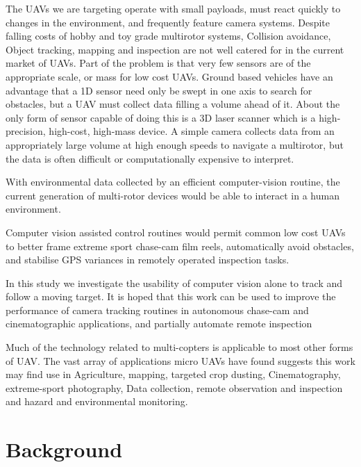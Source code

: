 \documentclass[a4paper, 11pt, titlepage]{article}
\begin{document}
      The UAVs we are targeting operate with small payloads, must react quickly to changes in the environment, and frequently feature camera systems.
      Despite falling costs of hobby and toy grade multirotor systems, Collision avoidance, Object tracking,   mapping and inspection are not well catered for in the current market of UAVs.
      Part of the problem is that very few sensors are of the appropriate scale, or mass for low cost UAVs.
      Ground based vehicles have an advantage that a 1D sensor need only be swept in one axis to search for obstacles, but a UAV must collect data filling a volume ahead of it. About the only form of sensor capable of doing this is a 3D laser scanner which is a high-precision, high-cost, high-mass device.
      A simple camera collects data from an appropriately large volume at high enough speeds to navigate a multirotor, but the data is often difficult or computationally expensive to interpret.

      With environmental data collected by an efficient computer-vision routine, the current generation of multi-rotor devices would be able to interact in a human environment.

      Computer vision assisted control routines would permit common low cost UAVs to better frame extreme sport chase-cam film reels, automatically avoid obstacles, and stabilise GPS variances in remotely operated inspection tasks.

      In this study we investigate the usability of computer vision alone to track and follow a moving target.  It is hoped that this work can be used to improve the performance of camera tracking routines in autonomous chase-cam and cinematographic applications, and partially automate remote inspection 

      Much of the technology related to multi-copters is applicable to most other forms of UAV.  The vast array of applications micro UAVs have found suggests this work may find use in Agriculture, mapping, targeted crop dusting, Cinematography, extreme-sport photography, Data collection, remote observation and inspection and hazard and environmental monitoring.

  \section{Background}
\end{document}
